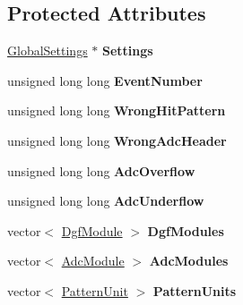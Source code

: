 \subsection*{Protected Attributes}
\begin{DoxyCompactItemize}
\item 
\hypertarget{class_unpacked_event_af05cdc5cd976188aa4d876d48265dd4e}{\hyperlink{class_global_settings}{Global\-Settings} $\ast$ {\bfseries Settings}}\label{class_unpacked_event_af05cdc5cd976188aa4d876d48265dd4e}

\item 
\hypertarget{class_unpacked_event_ad798c6e08da59b6964c5ad2b3bee4cde}{unsigned long long {\bfseries Event\-Number}}\label{class_unpacked_event_ad798c6e08da59b6964c5ad2b3bee4cde}

\item 
\hypertarget{class_unpacked_event_a3930bce3510be78df4058f5107a15313}{unsigned long long {\bfseries Wrong\-Hit\-Pattern}}\label{class_unpacked_event_a3930bce3510be78df4058f5107a15313}

\item 
\hypertarget{class_unpacked_event_a1011d28310c7f0f5dbbb8414ddb616a8}{unsigned long long {\bfseries Wrong\-Adc\-Header}}\label{class_unpacked_event_a1011d28310c7f0f5dbbb8414ddb616a8}

\item 
\hypertarget{class_unpacked_event_aeef1201a91a0280b7c88e4b8ddf7a2d3}{unsigned long long {\bfseries Adc\-Overflow}}\label{class_unpacked_event_aeef1201a91a0280b7c88e4b8ddf7a2d3}

\item 
\hypertarget{class_unpacked_event_a19ba633f09a9d52648d095118536b3b2}{unsigned long long {\bfseries Adc\-Underflow}}\label{class_unpacked_event_a19ba633f09a9d52648d095118536b3b2}

\item 
\hypertarget{class_unpacked_event_af4bb3effdfadd4a684a4296931be1379}{vector$<$ \hyperlink{class_dgf_module}{Dgf\-Module} $>$ {\bfseries Dgf\-Modules}}\label{class_unpacked_event_af4bb3effdfadd4a684a4296931be1379}

\item 
\hypertarget{class_unpacked_event_a023f5c7816352ca7b49cc8908ce37546}{vector$<$ \hyperlink{class_adc_module}{Adc\-Module} $>$ {\bfseries Adc\-Modules}}\label{class_unpacked_event_a023f5c7816352ca7b49cc8908ce37546}

\item 
\hypertarget{class_unpacked_event_a147d614bb78b22864dc99425bdc955cc}{vector$<$ \hyperlink{class_pattern_unit}{Pattern\-Unit} $>$ {\bfseries Pattern\-Units}}\label{class_unpacked_event_a147d614bb78b22864dc99425bdc955cc}


\end{DoxyCompactItemize}
